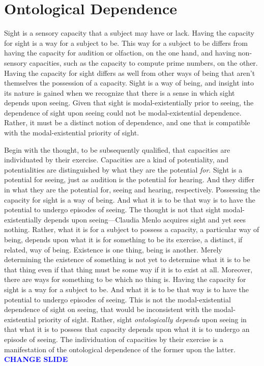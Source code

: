\documentclass[12pt]{article}
\newcommand{\change}{\textcolor{blue}{\textbf{CHANGE SLIDE}}}
\begin{document}

\section{Ontological Dependence} %
\label{sec:ontological_dependence}

Sight is a sensory capacity that a subject may have or lack. Having the capacity for sight is a way for a subject to be. This way for a subject to be differs from having the capacity for audition or olfaction, on the one hand, and having non-sensory capacities, such as the capacity to compute prime numbers, on the other. Having the capacity for sight differs as well from other ways of being that aren't themselves the possession of a capacity. Sight is a way of being, and insight into its nature is gained when we recognize that there is a sense in which sight depends upon seeing. Given that sight is modal-existentially prior to seeing, the dependence of sight upon seeing could not be modal-existential dependence. Rather, it must be a distinct notion of dependence, and one that is compatible with the modal-existential priority of sight.

Begin with the thought, to be subsequently qualified, that capacities are individuated by their exercise. Capacities are a kind of potentiality, and potentialities are distinguished by what they are the potential \emph{for}. Sight is a potential for seeing, just as audition is the potential for hearing. And they differ in what they are the potential for, seeing and hearing, respectively. Possessing the capacity for sight is a way of being. And what it is to be that way is to have the potential to undergo episodes of seeing. The thought is not that sight modal-existentially depends upon seeing---Claudia Menlo acquires sight and yet sees nothing. Rather, what it is for a subject to possess a capacity, a particular way of being, depends upon what it is for something to be its exercise, a distinct, if related, way of being. Existence is one thing, being is another. Merely determining the existence of something is not yet to determine what it is to be that thing even if that thing must be some way if it is to exist at all. Moreover, there are ways for something to be which no thing is. Having the capacity for sight is a way for a subject to be. And what it is to be that way is to have the potential to undergo episodes of seeing. This is not the modal-existential dependence of sight on seeing, that would be inconsistent with the modal-existential priority of sight. Rather, sight \emph{ontologically depends} upon seeing in that what it is to possess that capacity depends upon what it is to undergo an episode of seeing. The individuation of capacities by their exercise is a manifestation of the ontological dependence of the former upon the latter. \change
\end{document}
